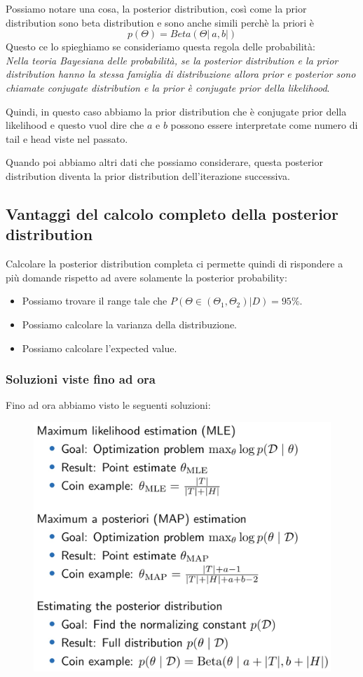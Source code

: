 \documentclass[14pt]{extreport}
\begin{document}
Possiamo notare una cosa, la posterior distribution, così come la prior distribution sono beta distribution e sono anche simili perchè la priori è
$$p(\Theta) = Beta(\Theta|\ a, b|)$$ Questo ce lo spieghiamo se consideriamo questa regola delle probabilità:\\
\textit{Nella teoria Bayesiana delle probabilità, se la posterior distribution e la prior distribution hanno la stessa famiglia di distribuzione
allora prior e posterior sono chiamate conjugate distribution e la prior è conjugate prior della likelihood}.

Quindi, in questo caso abbiamo la prior distribution che è conjugate prior della likelihood e questo vuol dire che $a$ e $b$ possono essere
interpretate come numero di tail e head viste nel passato.

Quando poi abbiamo altri dati che possiamo considerare, questa posterior distribution diventa la prior distribution dell'iterazione successiva.

\subsection{Vantaggi del calcolo completo della posterior distribution}

Calcolare la posterior distribution completa ci permette quindi di rispondere a più domande rispetto ad avere solamente la posterior probability:
\begin{itemize}
\item Possiamo trovare il range tale che $P(\Theta \in (\Theta_1,\Theta_2)|D) = 95\%$.
\item Possiamo calcolare la varianza della distribuzione.
\item Possiamo calcolare l'expected value.
\end{itemize}

\subsubsection{Soluzioni viste fino ad ora}

Fino ad ora abbiamo visto le seguenti soluzioni:
\begin{figure}[H]
\centering
\includegraphics[width=0.5\linewidth]{46.jpeg}
\end{figure}
\end{document}
